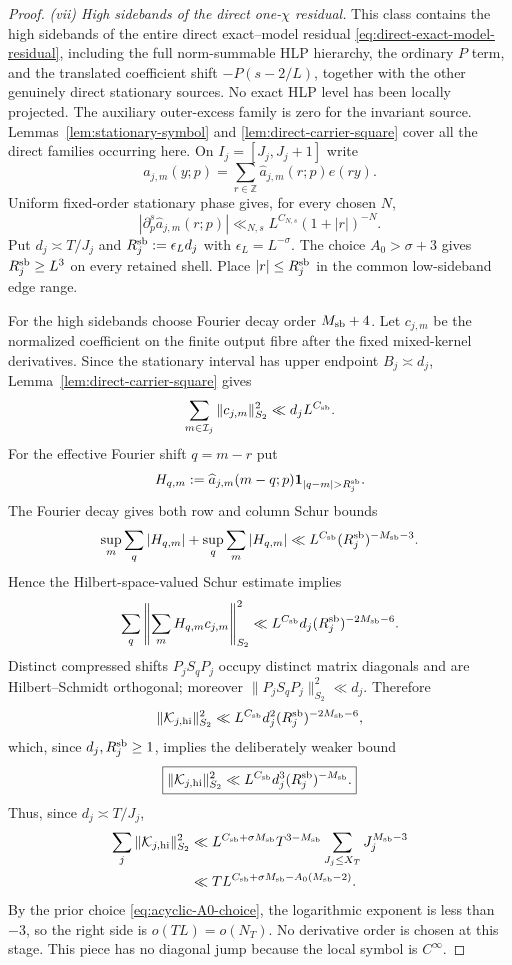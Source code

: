 \begin{proof}
\emph{(vii) High sidebands of the direct one-$\chi$ residual.}
This class contains the high sidebands of the entire direct exact--model
residual \eqref{eq:direct-exact-model-residual}, including the full
norm-summable HLP hierarchy, the ordinary $P$ term, and the translated
coefficient shift $-P(s-2/L)$, together with the other genuinely direct
stationary sources.  No exact HLP level has been locally projected.  The
auxiliary outer-excess family is zero for the invariant source.
Lemmas~\ref{lem:stationary-symbol} and \ref{lem:direct-carrier-square} cover all
the direct families occurring here. On
$I_j=[J_j,J_j+1]$ write
\[
a_{j,m}(y;p)=\sum_{r\in\mathbb Z}\widehat a_{j,m}(r;p)e(ry).
\]
Uniform fixed-order stationary phase gives, for every chosen $N$,
\[
|\partial_p^s\widehat a_{j,m}(r;p)|
\ll_{N,s}L^{C_{N,s}}(1+|r|)^{-N}.
\]
Put $d_j\asymp T/J_j$ and $R_j^{\rm sb}:=\epsilon_Ld_j$ with
$\epsilon_L=L^{-\sigma}$. The choice $A_0>\sigma+3$ gives
$R_j^{\rm sb}\ge L^3$ on every retained shell. Place
$|r|\le R_j^{\rm sb}$ in the common low-sideband edge range.

For the high sidebands choose Fourier decay order $M_{\rm sb}+4$. Let
$c_{j,m}$ be the normalized coefficient on the finite output fibre after the
fixed mixed-kernel derivatives. Since the stationary interval has upper
endpoint $B_j\asymp d_j$, Lemma~\ref{lem:direct-carrier-square} gives
\begin{equation}
\sum_{m\in\mathcal I_j}\|c_{j,m}\|_{S_2}^2
\ll d_jL^{C_{\rm sb}}.
\label{eq:carrier-square-one-shell}
\end{equation}
For the effective Fourier shift $q=m-r$ put
\[
H_{q,m}:=\widehat a_{j,m}(m-q;p)
\mathbf 1_{|q-m|>R_j^{\rm sb}}.
\]
The Fourier decay gives both row and column Schur bounds
\[
\sup_m\sum_q|H_{q,m}|+\sup_q\sum_m|H_{q,m}|
\ll L^{C_{\rm sb}}(R_j^{\rm sb})^{-M_{\rm sb}-3}.
\]
Hence the Hilbert-space-valued Schur estimate implies
\[
\sum_q\left\|\sum_mH_{q,m}c_{j,m}\right\|_{S_2}^2
\ll L^{C_{\rm sb}}d_j(R_j^{\rm sb})^{-2M_{\rm sb}-6}.
\]
Distinct compressed shifts $P_jS_qP_j$ occupy distinct matrix diagonals and are
Hilbert--Schmidt orthogonal; moreover
$\|P_jS_qP_j\|_{S_2}^2\ll d_j$. Therefore
\[
\|\mathcal K_{j,\rm hi}\|_{S_2}^2
\ll L^{C_{\rm sb}}d_j^2(R_j^{\rm sb})^{-2M_{\rm sb}-6},
\]
which, since $d_j,R_j^{\rm sb}\ge1$, implies the deliberately weaker bound
\begin{equation}
\boxed{
\|\mathcal K_{j,\rm hi}\|_{S_2}^2
\ll L^{C_{\rm sb}}d_j^3(R_j^{\rm sb})^{-M_{\rm sb}}.
}
\label{eq:high-sideband-one-shell}
\end{equation}
Thus, since $d_j\asymp T/J_j$,
\begin{align*}
\sum_j\|\mathcal K_{j,\rm hi}\|_{S_2}^2
&\ll L^{C_{\rm sb}+\sigma M_{\rm sb}}
T^{3-M_{\rm sb}}
\sum_{J_j\le X_T}J_j^{M_{\rm sb}-3}\\
&\ll T L^{C_{\rm sb}+\sigma M_{\rm sb}
-A_0(M_{\rm sb}-2)}.
\end{align*}
By the prior choice \eqref{eq:acyclic-A0-choice}, the logarithmic exponent is
less than $-3$, so the right side is $o(TL)=o(N_T)$. No derivative order is
chosen at this stage. This piece has no diagonal jump because the local symbol
is $C^\infty$.


\end{proof}
